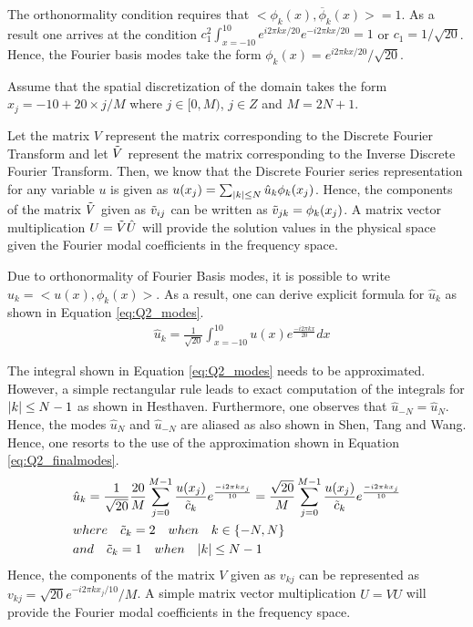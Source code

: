 \documentclass[12pt]{article}
\DeclarePairedDelimiter\abs{\lvert}{\rvert}
\begin{document}
The orthonormality condition requires that $<\phi_k(x), \overline{\phi}_k(x)> = 1$. As a result one arrives at the condition $c_1^2 \int_{x = -10}^{10} e^{i 2\pi k x /20} e^{-i 2\pi k x /20} = 1$ or $c_1 = 1/\sqrt{20}$. Hence, the Fourier basis modes take the form $\phi_k(x) = e^{i 2 \pi k x /20}/\sqrt{20}$.

Assume that the spatial discretization of the domain takes the form $x_j = -10 + 20 \times j/M$ where $j \in [0, M)$, $j \in Z$ and $M = 2N + 1$. 

Let the matrix $V$ represent the matrix corresponding to the Discrete Fourier Transform and let $\Tilde{V}$ represent the matrix corresponding to the Inverse Discrete Fourier Transform. Then, we know that the Discrete Fourier series representation for any variable $u$ is given as $u(x_j) = \sum_{\abs{k} \leq N} \hat{u}_k \phi_k(x_j)$. Hence, the components of the matrix $\Tilde{V}$ given as $\Tilde{v}_{ij}$ can be written as $\Tilde{v}_{jk} = \phi_k(x_j)$. A matrix vector multiplication $U = \Tilde{V} \hat{U}$ will provide the solution values in the physical space given the Fourier modal coefficients in the frequency space. 

Due to orthonormality of Fourier Basis modes, it is possible to write $\hat{u}_k = <u(x), \phi_k(x)>$. As a result, one can derive explicit formula for $\hat{u}_k$ as shown in Equation \ref{eq:Q2_modes}.
\begin{equation}
    \begin{aligned}
        & \hat{u}_k = \frac{1}{\sqrt{20}} \int_{x = -10}^{10} u(x) e^{\frac{-i 2 \pi k x}{20}} dx 
    \end{aligned}
\label{eq:Q2_modes}
\end{equation}

The integral shown in Equation \ref{eq:Q2_modes} needs to be approximated. However, a simple rectangular rule leads to exact computation of the integrals for $\abs{k} \leq N - 1$ as shown in Hesthaven. Furthermore, one observes that $\hat{u}_{-N} = \hat{u}_{N}$. Hence, the modes $\hat{u}_N$ and $\hat{u}_{-N}$ are aliased as also shown in Shen, Tang and Wang. Hence, one resorts to the use of the approximation shown in Equation \ref{eq:Q2_finalmodes}.
\begin{equation}
    \begin{aligned}
        & \hat{u}_k = \frac{1}{\sqrt{20}} \frac{20}{M} \sum_{j = 0}^{M - 1} \frac{u(x_j)}{\Tilde{c}_k} e^{\frac{-i 2 \pi k x_j}{10}} =   \frac{\sqrt{20}}{M} \sum_{j = 0}^{M - 1} \frac{u(x_j)}{\Tilde{c}_k} e^{\frac{-i 2 \pi k x_j}{10}} \\
        & where \quad \Tilde{c}_k = 2 \quad when \quad  k \in \{ -N, N \} \\
        & and \quad  \Tilde{c}_k = 1 \quad when \quad \abs{k} \leq N - 1
    \end{aligned}
    \label{eq:Q2_finalmodes}
\end{equation}
Hence, the components of the matrix $V$ given as $v_{kj}$ can be represented as $v_{kj} = \sqrt{20} e^{-i 2 \pi k x_j/10}/M$. A simple matrix vector multiplication $\hat{U} = VU$ will provide the Fourier modal coefficients in the frequency space.
\end{document}
